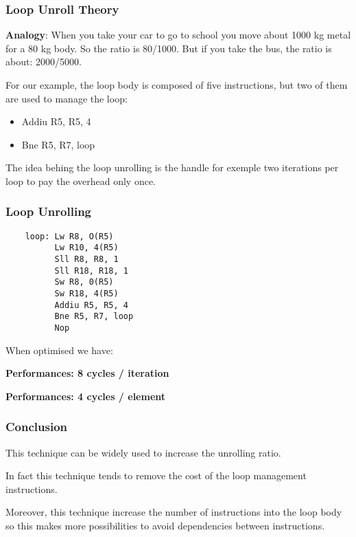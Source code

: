 
\begin{frame}
  \frametitle{Loop Unroll Theory}

  \textbf{Analogy}: When you take your car to go to school you move
  about 1000 kg metal for a 80 kg body. So the ratio is 80/1000. But
  if you take the bus, the ratio is about: 2000/5000.

  \nl

  For our example, the loop body is composed of five instructions, but
  two of them are used to manage the loop:

  \begin{itemize}[<+->]
    \item
      Addiu R5, R5, 4
    \item
      Bne R5, R7, loop
  \end{itemize}

  The idea behing the loop unrolling is the handle for exemple two
  iterations per loop to pay the overhead only once.
\end{frame}


\begin{frame}[containsverbatim]
  \frametitle{Loop Unrolling}

  \begin{verbatim}
    loop: Lw R8, O(R5)
          Lw R10, 4(R5)
          Sll R8, R8, 1
          Sll R18, R18, 1
          Sw R8, 0(R5)
          Sw R18, 4(R5)
          Addiu R5, R5, 4
          Bne R5, R7, loop
          Nop
  \end{verbatim}

  When optimised we have:

  \nl

  \textbf{Performances: 8 cycles / iteration}

  \textbf{Performances: 4 cycles / element}
\end{frame}


\begin{frame}
  \frametitle{Conclusion}

  This technique can be widely used to increase the unrolling ratio.

  \nl

  In fact this technique tends to remove the cost of the loop management
  instructions.

  \nl

  Moreover, this technique increase the number of instructions into the
  loop body so this makes more possibilities to avoid dependencies
  between instructions.
\end{frame}

